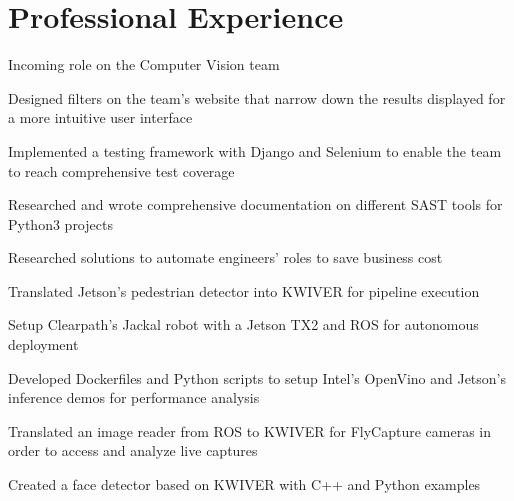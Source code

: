 \documentclass[]{deedy-resume-openfont}
\begin{document}
\hfill
\begin{minipage}[t]{0.66\textwidth} 


\section{Professional Experience}

\sectionsep
\begin{tightemize}
\item Incoming role on the Computer Vision team
\end{tightemize}
\sectionsep

\begin{tightemize}
\item Designed filters on the team's website that narrow down the results displayed for a more intuitive user interface
\item Implemented a testing framework with Django and Selenium to enable the team to reach comprehensive test coverage
\item Researched and wrote comprehensive documentation on different SAST tools for Python3 projects
\item Researched solutions to automate engineers' roles to save business cost
\end{tightemize}
\sectionsep

\begin{tightemize}
\item Translated Jetson's pedestrian detector into KWIVER for pipeline execution
\item Setup Clearpath's Jackal robot with a Jetson TX2 and ROS for autonomous deployment
\item Developed Dockerfiles and Python scripts to setup Intel's OpenVino and Jetson's inference demos for performance analysis
\item Translated an image reader from ROS to KWIVER for FlyCapture cameras in order to access and analyze live captures
\item Created a face detector based on KWIVER with C++ and Python examples
\end{tightemize}
\sectionsep


\end{minipage}
\end{document}
